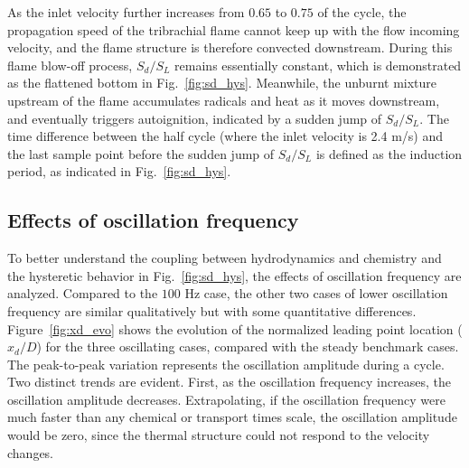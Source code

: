 \documentclass[review,3p,times]{elsarticle}
\begin{document}
\textcolor{Rev1}{As the inlet velocity further increases from $0.65$ to $0.75$ of the cycle, the propagation speed of the tribrachial flame cannot keep up with the flow incoming velocity, and the flame structure is therefore convected downstream.  During this flame blow-off process, $S_d/S_L$ remains essentially constant, which is demonstrated as the flattened bottom in Fig.~\ref{fig:sd_hys}.  Meanwhile, the unburnt mixture upstream of the flame accumulates radicals and heat as it moves downstream, and eventually triggers autoignition, indicated by a sudden jump of $S_d/S_L$.  The time difference between the half cycle (where the inlet velocity is 2.4 m/s) and the last sample point before the sudden jump of $S_d/S_L$ is defined as the induction period, as indicated in Fig.~\ref{fig:sd_hys}.} 

\subsection{Effects of oscillation frequency} \label{sec:frq}

\textcolor{Rev1}{To better understand the coupling between hydrodynamics and chemistry and the hysteretic behavior in Fig.~\ref{fig:sd_hys}, the effects of oscillation frequency are analyzed.}  Compared to the $100$ Hz case, the other two cases of lower oscillation frequency are similar qualitatively but with some quantitative differences.  \textcolor{Rev1}{Figure~\ref{fig:xd_evo} shows the evolution of the normalized leading point location ($x_d/D$) for the three oscillating cases, compared with the steady benchmark cases.  The peak-to-peak variation represents the oscillation amplitude during a cycle.  Two distinct trends are evident.  First, as the oscillation frequency increases, the oscillation amplitude decreases.  Extrapolating, if the oscillation frequency were much faster than any chemical or transport times scale, the oscillation amplitude would be zero, since the thermal structure could not respond to the velocity changes.}  
\end{document}
